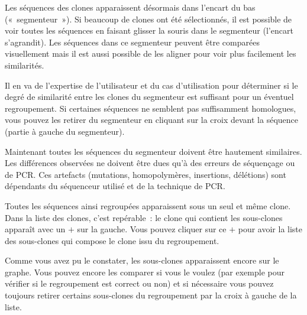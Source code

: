 \documentclass[11pt]{article}
\begin{document}
Les séquences des clones apparaissent désormais dans l'encart du bas
(«~segmenteur~»). Si beaucoup de clones ont été sélectionnés, il est
possible de voir toutes les séquences en faisant glisser la souris dans
le segmenteur (l'encart s'agrandit). Les séquences dans ce segmenteur
peuvent être comparées visuellement mais il est aussi possible de les
aligner pour voir plus facilement les similarités.

Il en va de l'expertise de l'utilisateur et du cas d'utilisation pour déterminer si le degré de
similarité entre les clones du segmenteur est suffisant pour un éventuel
regroupement. Si certaines séquences ne semblent pas suffisamment homologues,
vous pouvez les retirer du segmenteur en cliquant sur la croix devant la
séquence (partie à gauche du segmenteur).


Maintenant toutes les séquences du segmenteur doivent être hautement
similaires. Les différences observées ne doivent être dues qu'à des
erreurs de séquençage ou de PCR. Ces artefacts (mutations,
homopolymères, insertions, délétions) sont dépendants du séquenceur
utilisé et de la technique de PCR.


Toutes les séquences ainsi regroupées apparaissent sous un seul et même
clone. Dans la liste des clones, c'est repérable~: le clone qui contient
les sous-clones apparaît avec un $+$ sur la gauche. Vous pouvez
cliquer sur ce $+$ pour avoir la liste des sous-clones qui compose le
clone issu du regroupement.


Comme vous avez pu le constater, les sous-clones apparaissent encore sur
le graphe. Vous pouvez encore les comparer si vous le voulez (par
exemple pour vérifier si le regroupement est correct ou non) et si nécessaire
vous pouvez toujours retirer certains sous-clones du regroupement par la croix
à gauche de la liste.


\end{document}
